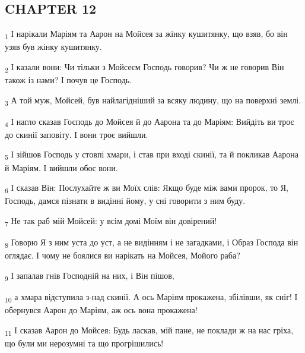 \subsection{CHAPTER 12}
\begin{tcolorbox}
\textsubscript{1} І нарікали Маріям та Аарон на Мойсея за жінку кушитянку, що взяв, бо він узяв був жінку кушитянку.
\end{tcolorbox}
\begin{tcolorbox}
\textsubscript{2} І казали вони: Чи тільки з Мойсеєм Господь говорив? Чи ж не говорив Він також із нами? І почув це Господь.
\end{tcolorbox}
\begin{tcolorbox}
\textsubscript{3} А той муж, Мойсей, був найлагідніший за всяку людину, що на поверхні землі.
\end{tcolorbox}
\begin{tcolorbox}
\textsubscript{4} І нагло сказав Господь до Мойсея й до Аарона та до Маріям: Вийдіть ви троє до скинії заповіту. І вони троє вийшли.
\end{tcolorbox}
\begin{tcolorbox}
\textsubscript{5} І зійшов Господь у стовпі хмари, і став при вході скинії, та й покликав Аарона й Маріям. І вийшли обоє вони.
\end{tcolorbox}
\begin{tcolorbox}
\textsubscript{6} І сказав Він: Послухайте ж ви Моїх слів: Якщо буде між вами пророк, то Я, Господь, дамся пізнати в видінні йому, у сні говорити з ним буду.
\end{tcolorbox}
\begin{tcolorbox}
\textsubscript{7} Не так раб мій Мойсей: у всім домі Моїм він довірений!
\end{tcolorbox}
\begin{tcolorbox}
\textsubscript{8} Говорю Я з ним уста до уст, а не видінням і не загадками, і Образ Господа він оглядає. І чому не боялися ви нарікать на Мойсея, Мойого раба?
\end{tcolorbox}
\begin{tcolorbox}
\textsubscript{9} І запалав гнів Господній на них, і Він пішов,
\end{tcolorbox}
\begin{tcolorbox}
\textsubscript{10} а хмара відступила з-над скинії. А ось Маріям прокажена, збілівши, як сніг! І обернувся Аарон до Маріям, аж ось вона прокажена!
\end{tcolorbox}
\begin{tcolorbox}
\textsubscript{11} І сказав Аарон до Мойсея: Будь ласкав, мій пане, не поклади ж на нас гріха, що були ми нерозумні та що прогрішились!
\end{tcolorbox}
